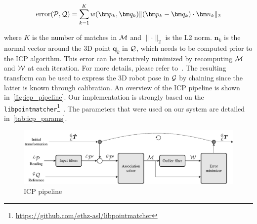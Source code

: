 \begin{equation}
	\text{error}(\readpc, \refpc) = \sum_{k=1}^{K} w(\bm p_k, \bm q_k) \lVert (\bm p_k - \bm q_k) \cdot \bm n_k \rVert_2
\end{equation}

where $K$ is the number of matches in $\mathcal{M}$ and $\lVert \cdot \rVert_2$ is the L2 norm. 
$\bm n_k$ is the normal vector around the 3D point $\bm q_k$ in $\mathcal{Q}$, which needs to be computed prior to the \ac{ICP} algorithm.
This error can be iteratively minimized by recomputing $\mathcal{M}$ and $\mathcal{W}$ at each iteration.
For more details, please refer to~\citep{Pomerleau2015}.
The resulting transform \transform{\lidarf}{\mapf} can be used to express the 3D robot pose in $\mathcal{G}$ by chaining \transform{\lidarf}{\mapf} \transform{\robotf}{\lidarf} since the latter is known through calibration.
An overview of the \ac{ICP} pipeline is shown in~\autoref{fig:icp_pipeline}.
Our implementation is strongly based on the \texttt{libpointmatcher}\footnote{\url{https://github.com/ethz-asl/libpointmatcher}}~\citep{Pomerleau2013}.
The parameters that were used on our system are detailed in~\autoref{tab:icp_params}.


\begin{figure} [htpb]
	\centering
	\includegraphics[width=\linewidth]{figs/icp_pipeline/icp_pipeline.pdf}
	\caption{ICP pipeline}
	\label{fig:icp_pipeline}
\end{figure}


